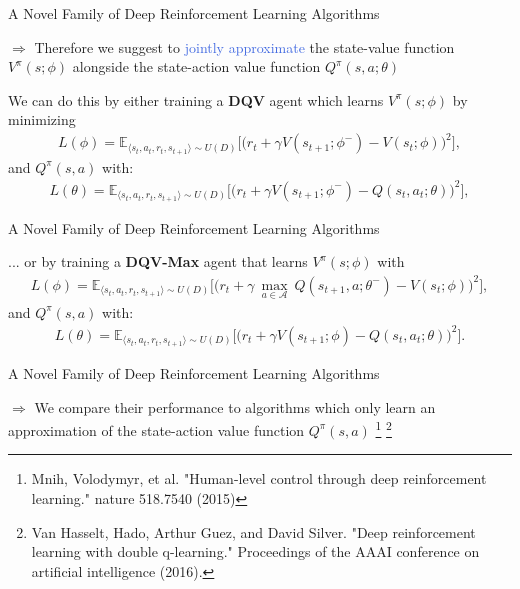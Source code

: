 \documentclass{beamer}
\begin{document}
\begin{frame}{A Novel Family of Deep Reinforcement Learning Algorithms}
	\bigskip

	$\Rightarrow$ Therefore we suggest to \textcolor{RoyalBlue}{jointly approximate} the state-value function $V^{\pi}(s;\phi)$ alongside the state-action value function $Q^{\pi}(s,a;\theta)$

	\bigskip

	We can do this by either training a \textcolor{skymagenta}{\textbf{DQV}} agent which learns $V^{\pi}(s;\phi)$ by minimizing
		\begin{multline*}
L(\phi) = \mathds{E}_{\langle s_{t},a_{t},r_{t},s_{t+1}\rangle\sim U(D)} \bigg[\big(r_{t} + \gamma V(s_{t+1}; \phi^{-}) - V(s_{t}; \phi)\big)^{2}\bigg],
		\end{multline*}			
		and $Q^{\pi}(s,a)$ with:
		\begin{multline*}
    			L(\theta) = \mathds{E}_{\langle s_{t},a_{t},r_{t},s_{t+1}\rangle\sim U(D)} \bigg[\big(r_{t} + \gamma V(s_{t+1}; \phi^{-}) - Q(s_{t}, a_{t}; \theta)\big)^{2}\bigg],
		\end{multline*}

\end{frame}

\begin{frame}{A Novel Family of Deep Reinforcement Learning Algorithms}

	... or by training a \textcolor{skymagenta}{\textbf{DQV-Max}} agent that learns $V^{\pi}(s;\phi)$ with
	\begin{multline*}
		L(\phi) = \mathds{E}_{\langle s_{t},a_{t},r_{t},s_{t+1}\rangle\sim U(D)} \bigg[\big(r_{t} + \gamma \: \underset{a\in \mathcal{A}}{\max}\: Q(s_{t+1}, a; \theta^{-}) - V(s_{t}; \phi)\big)^{2}\bigg],
	\end{multline*}
	and $Q^{\pi}(s,a)$ with:
	\begin{multline*}
    		L(\theta) = \mathds{E}_{\langle s_{t},a_{t},r_{t},s_{t+1}\rangle\sim U(D)} \bigg[\big(r_{t} + \gamma V(s_{t+1}; \phi) - Q(s_{t}, a_{t}; \theta)\big)^{2}\bigg].
	\end{multline*}
\end{frame}

\begin{frame}{A Novel Family of Deep Reinforcement Learning Algorithms}

	\bigskip

	$\Rightarrow$ We compare their performance to algorithms which only learn an approximation of the state-action value function $Q^\pi(s,a)$ \footnote{Mnih, Volodymyr, et al. "Human-level control through deep reinforcement learning." nature 518.7540 (2015)} \footnote{Van Hasselt, Hado, Arthur Guez, and David Silver. "Deep reinforcement learning with double q-learning." Proceedings of the AAAI conference on artificial intelligence (2016).}

\end{frame}
\end{document}
